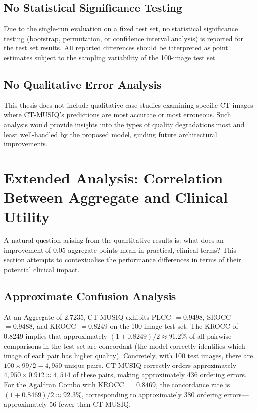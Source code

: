 \subsection{No Statistical Significance Testing}

Due to the single-run evaluation on a fixed test set, no statistical significance testing
(bootstrap, permutation, or confidence interval analysis) is reported for the test set
results. All reported differences should be interpreted as point estimates subject to
the sampling variability of the 100-image test set.

\subsection{No Qualitative Error Analysis}

This thesis does not include qualitative case studies examining specific CT images where
CT-MUSIQ's predictions are most accurate or most erroneous. Such analysis would provide
insights into the types of quality degradations most and least well-handled by the
proposed model, guiding future architectural improvements.

\section{Extended Analysis: Correlation Between Aggregate and Clinical Utility}
\label{sec:results_clinical}

A natural question arising from the quantitative results is: what does an improvement
of 0.05 aggregate points mean in practical, clinical terms? This section attempts to
contextualise the performance differences in terms of their potential clinical impact.

\subsection{Approximate Confusion Analysis}

At an Aggregate of 2.7235, CT-MUSIQ exhibits PLCC~$= 0.9498$, SROCC~$= 0.9488$, and
KROCC~$= 0.8249$ on the 100-image test set. The KROCC of 0.8249 implies that approximately
$(1 + 0.8249)/2 \approx 91.2\%$ of all pairwise comparisons in the test set are concordant
(the model correctly identifies which image of each pair has higher quality). Concretely,
with 100 test images, there are $100 \times 99 / 2 = 4,950$ unique pairs. CT-MUSIQ
correctly orders approximately $4,950 \times 0.912 \approx 4,514$ of these pairs, making
approximately 436 ordering errors. For the Agaldran Combo with KROCC~$= 0.8469$, the
concordance rate is $(1 + 0.8469)/2 \approx 92.3\%$, corresponding to approximately 380
ordering errors---approximately 56 fewer than CT-MUSIQ.

